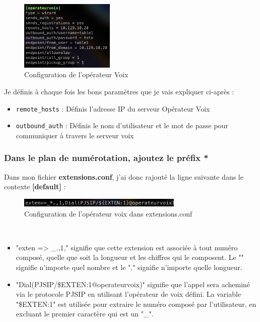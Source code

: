 \documentclass[12pt, a4paper]{article}
\begin{document}
	\begin{figure}[h]
		\centering
		\includegraphics[width=0.4\textwidth]{img/inter.png}
		\caption{Configuration de l'opérateur Voix}
		\label{fig:opvoix}
	\end{figure}
	Je définis à chaque fois les bons paramètres que je vais expliquer ci-après :
	\begin{itemize}
		\item \texttt{remote\_hosts} : Définis l'adresse IP du serveur Opérateur Voix
		\item \texttt{outbound\_auth} : Définis le nom d'utilisateur et le mot de passe pour communiquer à travers le serveur voix
	\end{itemize}


	\subsubsection{Dans le plan de numérotation, ajoutez le préfix *}
	Dans mon fichier \textbf{extensions.conf}, j'ai donc rajouté la ligne suivante
	dans le contexte \textbf{[default]} :
	\begin{figure}[h]
		\centering
		\includegraphics[width=0.7\textwidth]{img/exten-op.png}
		\caption{Configuration de l'opérateur voix dans extensions.conf}
		\label{fig:op-ext}
	\end{figure}\\
	\begin{itemize}
		\item "exten => \_.,1," signifie que cette extension est associée à tout numéro composé, quelle que soit la longueur et les chiffres qui le composent. Le "" signifie n'importe quel nombre et le "." signifie n'importe quelle longueur.
		\item "Dial(PJSIP/\${EXTEN:1}@operateurvoix)" signifie que l'appel sera acheminé via le protocole PJSIP en utilisant l'opérateur de voix défini. La variable "\${EXTEN:1}" est utilisée pour extraire le numéro composé par l'utilisateur, en excluant le premier caractère qui est un "\_".
	\end{itemize}
\end{document}
